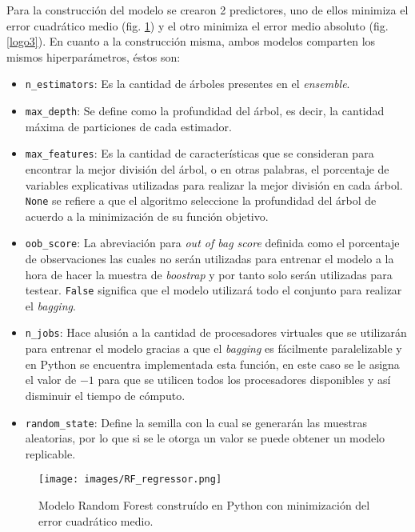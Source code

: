 Para la construcción del modelo se crearon 2 predictores, uno de ellos minimiza el error cuadrático medio (fig. \ref{logo2}) y el otro minimiza el error medio absoluto (fig. \ref{logo3}). En cuanto a la construcción misma, ambos modelos comparten los mismos hiperparámetros, 
éstos son:
\begin{itemize}
    \item \texttt{n\_estimators}: Es la cantidad de árboles presentes en el \textit{ensemble}. 
    \item \texttt{max\_depth}: Se define como la profundidad del árbol, es decir, la cantidad máxima de particiones de cada estimador.
    \item \texttt{max\_features}: Es la cantidad de características que se consideran para encontrar la mejor división del árbol, o en otras palabras, el porcentaje de variables explicativas utilizadas para realizar la mejor división en cada árbol. \texttt{None} 
    se refiere a que el algoritmo seleccione la profundidad del árbol de acuerdo a la minimización de su función objetivo.
    \item \texttt{oob\_score}: La abreviación para \textit{out of bag score} definida como el porcentaje de observaciones las cuales no serán utilizadas para entrenar el modelo a la hora de hacer la muestra de \textit{boostrap} y por tanto solo serán utilizadas para testear.
    \texttt{False} significa que el modelo utilizará todo el conjunto para realizar el \textit{bagging}.
    \item \texttt{n\_jobs}: Hace alusión a la cantidad de procesadores virtuales que se utilizarán para entrenar el modelo gracias a que el \textit{bagging} es fácilmente paralelizable y en Python se encuentra implementada esta función, en este caso se le asigna el valor de  
    $-1$ para que se utilicen todos los procesadores disponibles y así disminuir el tiempo de cómputo.
    \item \texttt{random\_state}: Define la semilla con la cual se generarán las muestras aleatorias, por lo que si se le otorga un valor se puede obtener un modelo replicable.
\end{itemize}

\begin{figure}[H]
    \centering
          \texttt{[image: images/RF\_regressor.png]}
          \vskip -0.1in
    \caption[Construcción y entrenamiento del modelo Random Forest con criterio de \textit{mse}]{\footnotesize Modelo Random Forest construído en Python con minimización del error cuadrático medio.}
    \label{logo2}
\end{figure}

